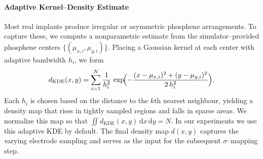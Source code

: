 \paragraph{Adaptive Kernel–Density Estimate}
Most real implants produce irregular or asymmetric phosphene arrangements. To capture these, we compute a nonparametric estimate from the simulator–provided phosphene centers \(\{(\mu_{x,i},\mu_{y,i})\}\). Placing a Gaussian kernel at each center with adaptive bandwidth \(h_i\), we form
\[
d_{\mathrm{KDE}}(x,y)
= \sum_{i=1}^N \frac{1}{h_i^2}\,
\exp\!\Bigl(-\frac{(x-\mu_{x,i})^2 + (y-\mu_{y,i})^2}{2\,h_i^2}\Bigr).
\]
Each \(h_i\) is chosen based on the distance to the \(k\)th nearest neighbour, yielding a density map that rises in tightly sampled regions and falls in sparse areas. We normalize this map so that
$ 
\iint d_{\mathrm{KDE}}(x,y)\,\mathrm{d}x\,\mathrm{d}y = N.
$
In our experiments we use this adaptive KDE by default. The final density map \(d(x,y)\) captures the varying electrode sampling and serves as the input for the subsequent \(\sigma\)–mapping step.
